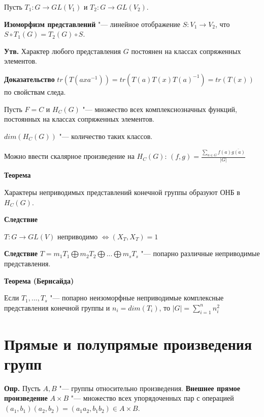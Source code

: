 \documentclass{article}
\begin{document}
Пусть $T_1: G \rightarrow GL(V_1)$ и $T_2: G \rightarrow GL(V_2)$.

\textbf{Изоморфизм представлений} "--- линейное отображение $S: V_1 \rightarrow V_2$, что $S \circ T_1(G) = T_2(G) \circ S$.

\vspace{10pt}

\textbf{Утв.}
Характер любого представления $G$ постоянен на классах сопряженных элементов.

\vspace{5pt}

\textbf{Доказательство}
$tr(T(axa^{-1})) = tr(T(a)T(x)T(a)^{-1}) = tr(T(x))$ по свойствам следа.

\vspace{10pt}

Пусть $F = C$ и $H_C(G)$ "--- множество всех комплекснозначных функций, постоянных на классах сопряженных элементов.

$dim(H_C(G))$ "--- количество таких классов.

Можно ввести скалярное произведение на $H_C(G)$: $(f, g) = \frac{\sum \limits_{a \in G} f(a)\overline{g(a)}}{|G|}$

\vspace{10pt}

\textbf{Теорема}

Характеры неприводимых представлений конечной группы образуют ОНБ в $H_C(G)$.

\textbf{Следствие}

$T: G \rightarrow GL(V)$ неприводимо $\Leftrightarrow (X_T, X_T) = 1$

\vspace{10pt}

\textbf{Следствие}
$T = m_1T_1 \bigoplus m_2T_2 \bigoplus ... \bigoplus m_sT_s$ "--- попарно различные неприводимые представления.

\vspace{10pt}

\textbf{Теорема (Бернсайда)}

Если $T_1 , ... , T_s$ "--- попарно неизоморфные неприводимые комплексные представления конечной группы и $n_i = dim(T_i)$, то $|G| = \sum \limits_{i = 1}^n n_i^2$

\section{Прямые и полупрямые произведения групп}

\textbf{Опр.} Пусть $A, B$ "--- группы относительно произведения. \textbf{Внешнее прямое произведение} $A \times B$ "--- множество всех упорядоченных пар с операцией $(a_1, b_1)(a_2, b_2) = (a_1a_2, b_1b_2) \in A \times B$.
\end{document}
